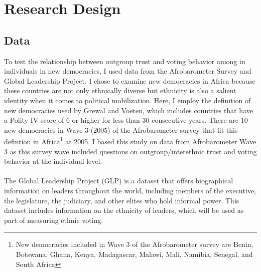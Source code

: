 \documentclass[a4paper, 12pt]{article}
\begin{document}
\section{Research Design}
\subsection{Data}
To test the relationship between outgroup trust and voting behavior among in individuals in new democracies, I used data from the Afrobarometer Survey and Global Leadership Project. I chose to examine new democracies in Africa because these countries are not only ethnically diverse but ethnicity is also a salient identity when it comes to political mobilization. Here, I employ the definition of new democracies used by Grewal and Voeten\cite{grewalAreNewDemocracies2015}, which includes countries that have a Polity IV score of 6 or higher for less than 30 consecutive years. There are 10 new democracies in Wave 3 (2005) of the Afrobarometer survey that fit this defintion in Africa\footnote{New democracies included in Wave 3 of the Afrobarometer survey are Benin, Botswana, Ghana, Kenya, Madagascar, Malawi, Mali, Namibia, Senegal, and South Africa} at 2005. I based this study on data from Afrobarometer Wave 3 as this survey wave included questions on outgroup/interethnic trust and voting behavior at the individual-level.
\paragraph{}
The Global Leadership Project (GLP) is a dataset that offers biographical information on leaders throughout the world, including members of the executive, the legislature, the judiciary, and other elites who hold informal power\cite{gerringWhoRulesWorld2019}. This dataset includes information on the ethnicity of leaders, which will be used as part of measuring ethnic voting. 
\end{document}
